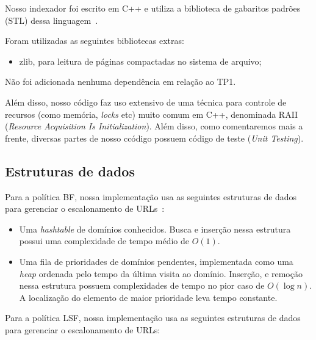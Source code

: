 \documentclass[10pt,twocolumn]{article}
\begin{document}
Nosso indexador foi escrito em C++
e utiliza a biblioteca de gabaritos padrões (STL) dessa
linguagem~\cite{stroustrup97}.

Foram utilizadas as seguintes bibliotecas extras:
\begin{itemize}
\item zlib, para leitura de páginas compactadas no sistema de
arquivo;
\end{itemize}

Não foi adicionada nenhuma dependência em relação ao TP1.

Além disso, nosso código faz uso extensivo de uma técnica para controle
de recursos (como memória, \emph{locks} etc)  muito comum em C++,
denominada RAII (\emph{Resource Acquisition Is Initialization}).
Além disso, como comentaremos mais a frente, diversas partes de nosso
ccódigo possuem código de teste (\emph{Unit Testing}).

\subsection{Estruturas de dados}\label{sec:datastructures}

Para a política BF, nossa implementação usa as seguintes estruturas de
dados para gerenciar o escalonamento de URLs~\cite{cormen-algorithms}:

\begin{itemize}
\item Uma \emph{hashtable} de domínios conhecidos. Busca e inserção
nessa estrutura possui uma complexidade de tempo médio de \(O\left(1 
\right)\).
\item Uma fila de prioridades de domínios pendentes, implementada como
uma \emph{heap} ordenada pelo tempo da última visita ao domínio.
Inserção, e remoção nessa estrutura possuem
complexidades de tempo no pior caso de \(O\left(\log n\right)\). A
localização do elemento de maior prioridade leva tempo constante.
\end{itemize}

Para a política LSF, nossa implementação usa as seguintes estruturas de
dados para gerenciar o escalonamento de URLs:
\end{document}
